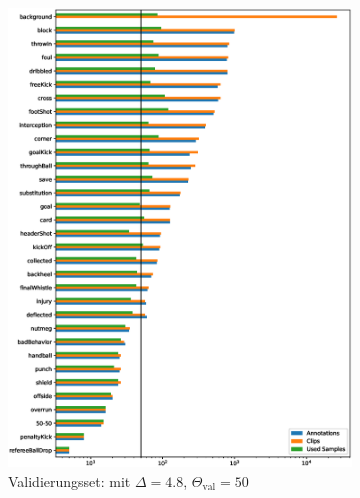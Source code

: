 \begin{figure}
\begin{subfigure}[b]{.33\textwidth}
        \includegraphics[width=.95\linewidth]{img/05_class_distribution_val_delta_5_Theta_50.eps}
        \caption{Validierungsset: \newline mit $\Delta=4.8$, $\Theta_{\text{val}}=50$}
    \end{subfigure}
    \begin{subfigure}[b]{.33\textwidth}
        \centering

\end{subfigure}
\end{figure}
